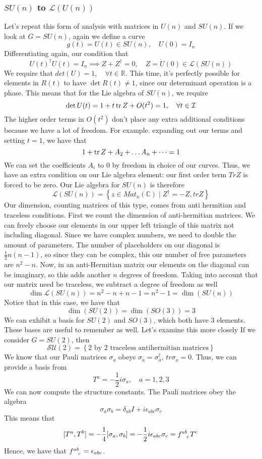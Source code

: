 \subsubsection{ $ SU ( n ) $ to $ \mathcal{ L } ( U ( n ) ) $}
Let's repeat this form of analysis with matrices in 
$ U ( n ) $ and $ SU ( n ) $. 
If we look at $ G = SU ( n ) $, 
again we define a curve 
\[
g ( t) = U ( t) \in SU ( n ), \quad U ( 0 ) = I_n  
\] Differentiating again, our condition that 
\[
 U ( t)^\dagger U ( t )  = I_n \implies Z + Z^\dagger = 0, \quad Z = \dot{ U } ( 0 ) \in \mathcal{ L }( SU ( n ) ) 
\] We require that $ det ( U ) = 1 , \quad \forall t \in \mathbb{ R} $. 
This time, it's perfectly possible for elements in 
$ R (t)$ to have  $ \det  R( t) \neq 1 $, since 
our determinant operation is a phase. 
This means that for the Lie algebra of $ SU ( n ) $, 
we require 
\[
 \det U ( t) = 1 + t \tr Z   + O ( t^2)  = 1, \quad  \forall t \in \mathcal{ I  }
\] 
The higher order terms in $ O ( t^2 ) $ don't place 
any extra additional conditions because we have a lot of freedom. For example. 
expanding out our terms and setting $ t = 1 $, we have
that 
 \[
 1 + \tr Z  + A_2 + \dots A_n + \dots = 1
\] We can set the coefficients $ A_i $ to 0 
by freedom in choice of our curves. Thus, 
we have an extra condition on our Lie algebra element:
our first order term $ Tr Z $ is forced to be zero. 
Our Lie algebra for $ SU ( n ) $ is therefore 
\[
 \mathcal{ L }( SU ( n ) ) = \left\{  z \in Mat_n ( \mathbb{ C} ) \mid Z^\dagger  = - Z, tr Z  \right\} 
\] Our dimension, counting matrices of this type, comes from anti hermitian and traceless conditions.
First we count the dimension of 
anti-hermitian matrices. We can freely 
choose our elements in our upper left triangle 
of this matrix not including diagonal. Since we have complex numbers, 
we need to double the amount of parameters. The number 
of placeholders on our diagonal is $\frac{1}{2 } n ( n - 1) $, 
so since they can be complex, this our number of 
free parameters are $ n ^ 2 - n $. Now, in an anti-Hermitian matrix 
our elements on the diagonal can be imaginary, so this adds another 
$ n $ degrees of freedom. Taking into account that our matrix need be traceless, 
we subtract a degree of freedom as well 
\[
 \dim \mathcal{ L } (  SU ( n ) )  =  n ^ 2 - n + n - 1 = n^ 2 - 1 = \dim (  SU ( n ) )   
\] 
Notice that in this case, we have that 
\[
\dim ( SU ( 2) ) = \dim ( SO ( 3) ) = 3 
\] We can exhibit a basis for $ SU ( 2) $ and $ SO ( 3) $, 
which both have 3 elements. These bases are 
useful to remember as well. Let's examine this more closely 
If we consider $ G = SU ( 2) $, 
then  \[
	\mathcal{ SU ( 2) } = \left\{ \text{2 by 2 traceless antihermitian matrices}  \right\} 
\] We know that our Pauli matrices $ \sigma_ a $ obeys $ \sigma_ a = \sigma  _a ^ \dagger$,  $ tr \sigma_ a = 0$. 
Thus, we can provide a basis from 
 \[
 T ^ a = - \frac{1}{2 } i \sigma_ a , \quad a = 1,2, 3 
\] We can now compute the structure constants. The Pauli matrices obey the algebra 
\[
 \sigma_a \sigma_ b = \delta_{ ab } I + i \epsilon_{ abc } \sigma_ c
\] This means that 
\[
	[ T ^ a , T ^ b ] = - \frac{1}{ 4 } [ \sigma_ a , \sigma_ b ] = - \frac{1}{2 } i \epsilon_{ abc } \sigma_ c = f \indices{ ^ { ab } _ c } T ^ c  
\] Hence, we have that $ f \indices{^ { ab } _ c }  = \epsilon_{ abc } $. 

